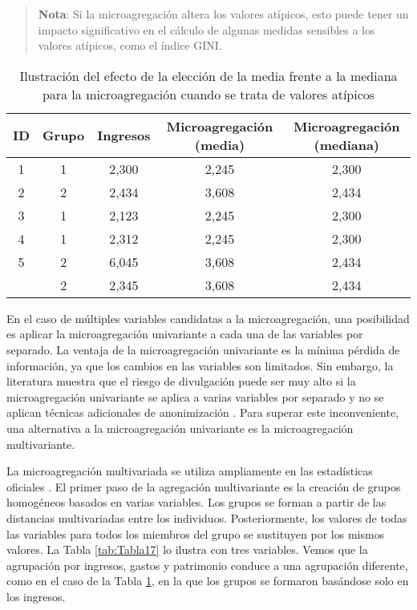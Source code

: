 \documentclass[
]{book}
\theoremstyle{definition}
\theoremstyle{definition}
\theoremstyle{definition}
\theoremstyle{definition}
\theoremstyle{remark}
\begin{document}
\begin{quote}
\textbf{Nota}: Si la microagregación altera los valores atípicos, esto puede tener un impacto significativo en el cálculo de algunas medidas sensibles a los valores atípicos, como el índice GINI.
\end{quote}

\begin{table}

\caption{\label{tab:Tabla16}\label{tab:Tabla16}Ilustración del efecto de la elección de la media frente a la mediana para la microagregación cuando se trata de valores atípicos}
\centering
\begin{tabular}[t]{ccccc}
\toprule
ID & Grupo & Ingresos & Microagregación (media) & Microagregación (mediana)\\
\midrule
1 & 1 & 2,300 & 2,245 & 2,300\\
2 & 2 & 2,434 & 3,608 & 2,434\\
3 & 1 & 2,123 & 2,245 & 2,300\\
4 & 1 & 2,312 & 2,245 & 2,300\\
5 & 2 & 6,045 & 3,608 & 2,434\\
\addlinespace
6 & 2 & 2,345 & 3,608 & 2,434\\
\bottomrule
\end{tabular}
\end{table}

En el caso de múltiples variables candidatas a la microagregación, una posibilidad es aplicar la microagregación univariante a cada una de las variables por separado. La ventaja de la microagregación univariante es la mínima pérdida de información, ya que los cambios en las variables son limitados. Sin embargo, la literatura muestra que el riesgo de divulgación puede ser muy alto si la microagregación univariante se aplica a varias variables por separado y no se aplican técnicas adicionales de anonimización \citep{DMOT02}. Para superar este inconveniente, una alternativa a la microagregación univariante es la microagregación multivariante.

La microagregación multivariada se utiliza ampliamente en las estadísticas oficiales \citep{benschop2019statistical}. El primer paso de la agregación multivariante es la creación de grupos homogéneos basados en varias variables. Los grupos se forman a partir de las distancias multivariadas entre los individuos. Posteriormente, los valores de todas las variables para todos los miembros del grupo se sustituyen por los mismos valores. La Tabla \ref{tab:Tabla17} lo ilustra con tres variables. Vemos que la agrupación por ingresos, gastos y patrimonio conduce a una agrupación diferente, como en el caso de la Tabla \ref{tab:Tabla16}, en la que los grupos se formaron basándose solo en los ingresos.
\end{document}
